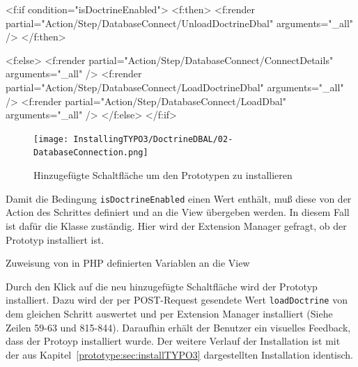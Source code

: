 \begin{htmlcode}
<f:if condition="{isDoctrineEnabled}">
	<f:then>
		<f:render partial="Action/Step/DatabaseConnect/UnloadDoctrineDbal" arguments="{_all}" />
	</f:then>

	<f:else>
		<f:render partial="Action/Step/DatabaseConnect/ConnectDetails" arguments="{_all}" />
		<f:render partial="Action/Step/DatabaseConnect/LoadDoctrineDbal" arguments="{_all}" />
		<f:render partial="Action/Step/DatabaseConnect/LoadDbal" arguments="{_all}" />
	</f:else>
</f:if>
\end{htmlcode}

\begin{figure}[H]
    \centering
    \texttt{[image: InstallingTYPO3/DoctrineDBAL/02-DatabaseConnection.png]}
    \caption{Hinzugefügte Schaltfläche um den Prototypen zu installieren}
    \label{fig:newDatabaseConnectionExtendsFromOldOne}
\end{figure}

Damit die Bedingung \texttt{isDoctrineEnabled} einen Wert enthält, muß diese von der Action des Schrittes definiert und an die View übergeben werden. In diesem Fall ist dafür die Klasse  zuständig. Hier wird der Extension Manager gefragt, ob der Prototyp installiert ist.

\begin{listing}
\caption{Zuweisung von in PHP definierten Variablen an die View}
\end{listing}

Durch den Klick auf die neu hinzugefügte Schaltfläche wird der Prototyp installiert. Dazu wird der per POST-Request gesendete Wert \texttt{loadDoctrine} von dem gleichen Schritt auswertet und per Extension Manager installiert (Siehe  Zeilen 59-63 und 815-844). Daraufhin erhält der Benutzer ein visuelles Feedback, dass der Protoyp installiert wurde. Der weitere Verlauf der Installation ist mit der aus Kapitel~\ref{prototype:sec:installTYPO3} dargestellten Installation identisch.

